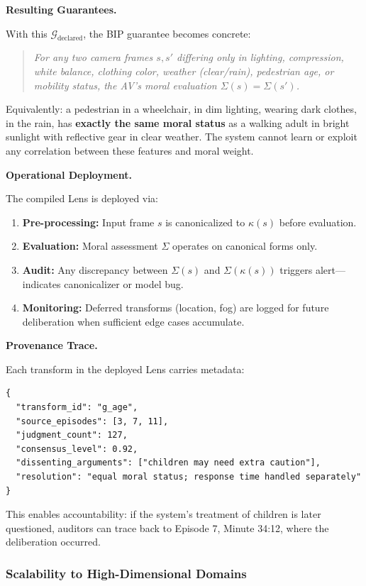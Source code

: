\documentclass[12pt]{article}
\begin{document}
\textbf{Resulting Guarantees.}

With this $\mathcal{G}_{\text{declared}}$, the BIP guarantee becomes concrete:

\begin{quote}
\emph{For any two camera frames $s, s'$ differing only in lighting, compression, white balance,
clothing color, weather (clear/rain), pedestrian age, or mobility status, the AV's moral
evaluation $\Sigma(s) = \Sigma(s')$.}
\end{quote}

Equivalently: a pedestrian in a wheelchair, in dim lighting, wearing dark clothes, in the rain,
has \textbf{exactly the same moral status} as a walking adult in bright sunlight with reflective gear
in clear weather. The system cannot learn or exploit any correlation between these features and
moral weight.

\textbf{Operational Deployment.}

The compiled Lens is deployed via:
\begin{enumerate}
\item \textbf{Pre-processing:} Input frame $s$ is canonicalized to $\kappa(s)$ before evaluation.
\item \textbf{Evaluation:} Moral assessment $\Sigma$ operates on canonical forms only.
\item \textbf{Audit:} Any discrepancy between $\Sigma(s)$ and $\Sigma(\kappa(s))$ triggers alert---indicates canonicalizer or
model bug.
\item \textbf{Monitoring:} Deferred transforms (location, fog) are logged for future deliberation when
sufficient edge cases accumulate.
\end{enumerate}

\textbf{Provenance Trace.}

Each transform in the deployed Lens carries metadata:

\begin{verbatim}
{
  "transform_id": "g_age",
  "source_episodes": [3, 7, 11],
  "judgment_count": 127,
  "consensus_level": 0.92,
  "dissenting_arguments": ["children may need extra caution"],
  "resolution": "equal moral status; response time handled separately"
}
\end{verbatim}

This enables accountability: if the system's treatment of children is later questioned, auditors
can trace back to Episode 7, Minute 34:12, where the deliberation occurred.

\subsubsection{Scalability to High-Dimensional Domains}
\end{document}
